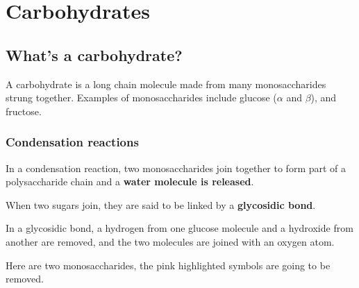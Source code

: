 \documentclass{article}
\begin{document}
\section*{Carbohydrates}

\subsection*{What's a carbohydrate?}

A carbohydrate is a long chain molecule made from many monosaccharides strung
together. Examples of monosaccharides include glucose ($\alpha$ and $\beta$),
and fructose.

\begin{center}
\end{center}


\subsubsection*{Condensation reactions}

In a condensation reaction, two monosaccharides join together to form part of a
polysaccharide chain and a {\bf water molecule is released}.

When two sugars join, they are said to be linked by a {\bf glycosidic bond}.

In a glycosidic bond, a hydrogen from one glucose molecule and a hydroxide from
another are removed, and the two molecules are joined with an oxygen atom.

Here are two monosaccharides, the pink highlighted symbols are going to be
removed.
\end{document}
